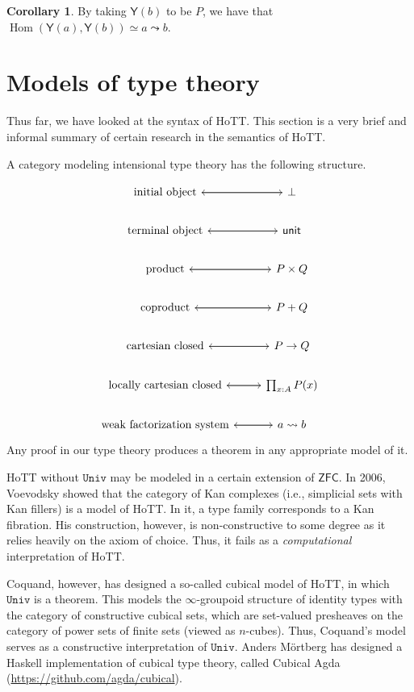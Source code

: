 \documentclass[10pt,letterpaper,cm]{nupset}
\theoremstyle{definition}
\theoremstyle{theorem}
\newtheorem{corollary}[definition]{Corollary}
\theoremstyle{remark}
\newcommand{\1}{\mathbf{1}}
\newcommand{\univ}{\mathtt{Univ}}
\newcommand{\0}{\vec 0}
\DeclareMathOperator{\Hom}{Hom}
\begin{document}
\begin{corollary}
By taking $\mathsf{Y}(b)$ to be $P$, we have that $\Hom(\mathsf{Y}(a), \mathsf{Y}(b)) \simeq a \leadsto b$.
\end{corollary}

\section{Models of type theory}

Thus far, we have looked at the syntax of HoTT. This section is a very brief and informal summary of certain research in the semantics of HoTT.

\medskip

A category modeling intensional type theory has the following structure.

\[
\begin{tikzcd}
\text{initial object} \arrow[r] & \bot \arrow[l] \\
\text{terminal object} \arrow[r] & \mathsf{unit} \arrow[l] \\
\text{product} \arrow[r] & P\times Q \arrow[l] \\
\text{coproduct} \arrow[r] & P + Q \arrow[l] \\
\text{cartesian closed} \arrow[r] & P \to Q \arrow[l] \\
\text{locally cartesian closed} \arrow[r] & \prod_{x:A}P(x) \arrow[l] \\
\text{weak factorization system} \arrow[r] & {a\leadsto b} \arrow[l]
\end{tikzcd}
\]
Any proof in our type theory produces a theorem in any appropriate model of it.

HoTT without $\univ$ may be modeled in a certain extension of $\mathsf{ZFC}$. In 2006, Voevodsky showed that the category of Kan complexes (i.e., simplicial sets with Kan fillers) is a model of HoTT.  In it, a type family corresponds to a Kan fibration.  His construction, however, is non-constructive to some degree as it relies heavily on the axiom of choice. Thus, it fails as a \emph{computational} interpretation of HoTT.

Coquand, however, has designed a so-called cubical model of HoTT, in which $\univ$ is a theorem. This models the $\infty$-groupoid structure of identity types with the category of constructive cubical sets, which are set-valued presheaves on the category of power sets of finite sets (viewed as $n$-cubes). Thus, Coquand's model serves as a constructive interpretation of $\univ$.  
Anders M\"ortberg has designed a Haskell implementation of cubical type theory, called Cubical Agda (\url{https://github.com/agda/cubical}).
\end{document}
